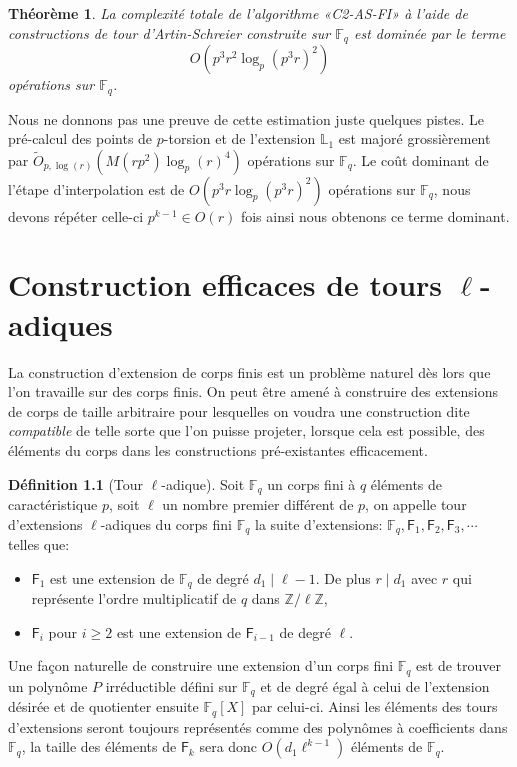 \documentclass[10pt,a4paper]{book}
\theoremstyle{plain}
\newtheorem{thm}{Théorème}[chapter]
\theoremstyle{definition}
\theoremstyle{definition}
\theoremstyle{definition}
\theoremstyle{definition}
\theoremstyle{definition}
\newtheorem{defi}[thm]{Définition}
\theoremstyle{remark}
\theoremstyle{remark}
\theoremstyle{definition}
\begin{document}
\begin{thm}
\label{thm:C2:FQ}
La complexité totale de l'algorithme «C2-AS-FI» à l'aide de constructions de 
tour d'Artin-Schreier construite sur $\mathbb{F}_q$ est dominée par le terme 
\[O(p^3r^2\log_p(p^3r)^2)\]
opérations sur $\mathbb{F}_q$.
\end{thm}

Nous ne donnons pas une preuve de cette estimation juste quelques pistes. Le 
pré-calcul des points de $p$-torsion et de l'extension $\mathbb{L}_1$ est 
majoré grossièrement par $\tilde{O}_{p,\log(r)}(M(rp^2)\log_{p}(r)^4)$ 
opérations sur $\mathbb{F}_q$. 
Le coût dominant de l'étape d'interpolation est de $O(p^3r\log_p(p^3r)^2)$ 
opérations sur $\mathbb{F}_q$, nous devons répéter celle-ci $p^{k-1} \in O(r)$ 
fois ainsi nous obtenons ce terme dominant.

\chapter{Construction efficaces de tours $\ell$-adiques}
\label{cha:tour}
La construction d'extension de corps finis est un problème naturel dès lors que l'on travaille sur des corps finis. On peut être amené à construire des extensions de corps de taille arbitraire pour lesquelles on voudra une construction dite \textit{compatible} de telle sorte que l'on puisse projeter, lorsque cela est possible, des éléments du corps dans les constructions pré-existantes efficacement.

\begin{defi}[Tour \textit{$\ell$}-adique]
\label{def:tour-ell}
Soit $\mathbb{F}_q$ un corps fini à $q$ éléments de caractéristique $p$, soit $\ell$ un nombre premier différent de $p$, on appelle tour d'extensions $\ell$-adiques du corps fini $\mathbb{F}_q$ la suite d'extensions: $\mathbb{F}_q, \mathsf{F}_{1}, \mathsf{F}_{2}, \mathsf{F}_{3}, \cdots$ telles que:
\begin{itemize}
\item $\mathsf{F}_{1}$ est une extension de $\mathbb{F}_q$ de degré $d_1 \mid \ell-1$. De plus $r \mid d_1$ avec $r$ qui représente l'ordre multiplicatif de $q$ dans $\mathbb{Z}/\ell \mathbb{Z}$,
\item $\mathsf{F}_{i}$ pour $i \geqslant 2$ est une extension de $\mathsf{F}_{i-1}$ de degré $\ell$.
\end{itemize}
\end{defi}

Une façon naturelle de  construire une extension d'un corps fini $\mathbb{F}_q$ est de trouver un polynôme $P$ irréductible défini sur $\mathbb{F}_q$ et de degré égal à celui de l'extension désirée et de quotienter ensuite $\mathbb{F}_q[X]$ par celui-ci.
Ainsi les éléments des tours d'extensions seront toujours représentés comme des polynômes à coefficients dans $\mathbb{F}_q$, la taille des éléments de $\mathsf{F}_{k}$ sera donc $O(d_1\ell^{k-1})$ éléments de $\mathbb{F}_q$. 
\end{document}
